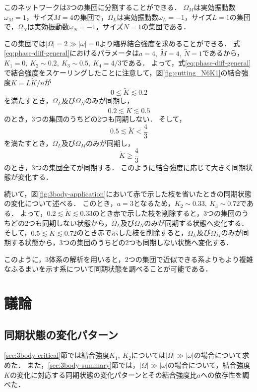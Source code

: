 \documentclass[../main]{subfiles}
\begin{document}
このネットワークは3つの集団に分割することができる．
$\Omega_M$は実効振動数$\omega_M=1$，サイズ$M=4$の集団で，$\Omega_L$は実効振動数$\omega_L=-1$，サイズ$L=1$の集団で，$\Omega_N$は実効振動数$\omega_N=-1$，サイズ$N=1$の集団である．

この集団では$|\Omega|=2\gg|\omega|=0$より臨界結合強度を求めることができる．
式\eqref{eq:phase-diff-general}におけるパラメータは$a=4,\ \tilde{M}=4,\ \tilde{N}=1$であるから，
$K_1=0,\ K_2\sim 0.2,\ K_3\sim 0.5,\ K_4=4/3$である．
よって，式\eqref{eq:phase-diff-general}で結合強度をスケーリングしたことに注意して，図\ref{fig:cutting_N6K1}の結合強度$K=L\tilde{K}/n$が
\begin{equation*}
    0\leq \tilde{K}\lesssim 0.2
\end{equation*}
を満たすとき，$\Omega_L$及び$\Omega_N$のみが同期し，
\begin{equation*}
    0.2\lesssim \tilde{K}\lesssim 0.5
\end{equation*}
のとき，3つの集団のうちどの2つも同期しない．
そして，
\begin{equation*}
    0.5\lesssim \tilde{K}<\frac{4}{3}
\end{equation*}
を満たすとき，$\Omega_L$及び$\Omega_M$のみが同期し，
\begin{equation*}
    \tilde{K}\geq \frac{4}{3}
\end{equation*}
のとき，3つの集団全てが同期する．
このように結合強度に応じて大きく同期状態が変化する．

続いて，図\ref{fig:3body-application}において赤で示した枝を省いたときの同期状態の変化について述べる．
このとき，$a=3$となるため，$K_2\sim 0.33,\ K_3\sim 0.72$である．
よって，$0.2\lesssim \tilde{K}\lesssim 0.33$のとき赤で示した枝を削除すると，3つの集団のうちどの2つも同期しない状態から，$\Omega_L$及び$\Omega_N$のみが同期する状態へ変化する．
そして，$0.5\lesssim \tilde{K}\lesssim 0.72$のとき赤で示した枝を削除すると，$\Omega_L$及び$\Omega_M$のみが同期する状態から，3つの集団のうちどの2つも同期しない状態へ変化する．

このように，3体系の解析を用いると，2つの集団で近似できる系よりもより複雑なふるまいを示す系について同期状態を調べることが可能である．


\section{議論}
\label{sec:3body-discussion}
\subsection{同期状態の変化パターン}
\ref{sec:3body-critical}節では結合強度$K_1,\ K_2$については$|\Omega|\gg|\omega|$の場合について求めた．
また，\ref{sec:3body-summary}節では，$|\Omega|\gg|\omega|$の場合について，結合強度$K$の変化に対応する同期状態の変化パターンとその結合強度比$a$への依存性を調べた．
\end{document}

